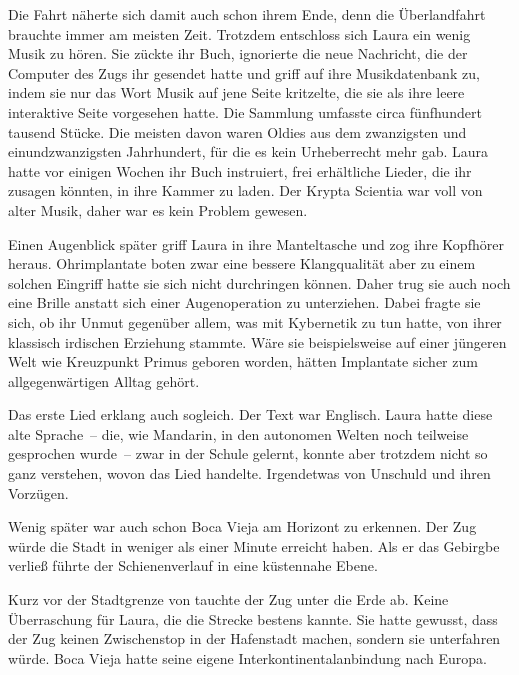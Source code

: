 \par

Die Fahrt näherte sich damit auch schon ihrem Ende, denn die Überlandfahrt brauchte immer am meisten Zeit. Trotzdem entschloss sich Laura ein wenig Musik zu hören. Sie zückte ihr Buch, ignorierte die neue Nachricht, die der Computer des Zugs ihr gesendet hatte und griff auf ihre Musikdatenbank zu, indem sie nur das Wort Musik auf jene Seite kritzelte, die sie als ihre leere interaktive Seite vorgesehen hatte. Die Sammlung umfasste circa fünfhundert tausend Stücke. Die meisten davon waren Oldies aus dem zwanzigsten und einundzwanzigsten Jahrhundert, für die es kein Urheberrecht mehr gab. Laura hatte vor einigen Wochen ihr Buch instruiert, frei erhältliche Lieder, die ihr zusagen könnten, in ihre Kammer zu laden. Der Krypta Scientia war voll von alter Musik, daher war es kein Problem gewesen.

\par

Einen Augenblick später griff Laura in ihre Manteltasche und zog ihre Kopfhörer heraus. Ohrimplantate boten zwar eine bessere Klangqualität aber zu einem solchen Eingriff hatte sie sich nicht durchringen können. Daher trug sie auch noch eine Brille anstatt sich einer Augenoperation zu unterziehen. Dabei fragte sie sich, ob ihr Unmut gegenüber allem, was mit Kybernetik zu tun hatte, von ihrer klassisch irdischen Erziehung stammte. Wäre sie beispielsweise auf einer jüngeren Welt wie Kreuzpunkt Primus geboren worden, hätten Implantate sicher zum allgegenwärtigen Alltag gehört.

\par

Das erste Lied erklang auch sogleich. Der Text war Englisch. Laura hatte diese alte Sprache~-- die, wie Mandarin, in den autonomen Welten noch teilweise gesprochen wurde~-- zwar in der Schule gelernt, konnte aber trotzdem nicht so ganz verstehen, wovon das Lied handelte. Irgendetwas von Unschuld und ihren Vorzügen.

\par

Wenig später war auch schon Boca Vieja am Horizont zu erkennen. Der Zug würde die Stadt in weniger als einer Minute erreicht haben. Als er das Gebirgbe verließ führte der Schienenverlauf in eine küstennahe Ebene.

\par

Kurz vor der Stadtgrenze von tauchte der Zug unter die Erde ab. Keine Überraschung für Laura, die die Strecke bestens kannte. Sie hatte gewusst, dass der Zug keinen Zwischenstop in der Hafenstadt machen, sondern sie unterfahren würde. Boca Vieja hatte seine eigene Interkontinentalanbindung nach Europa.

